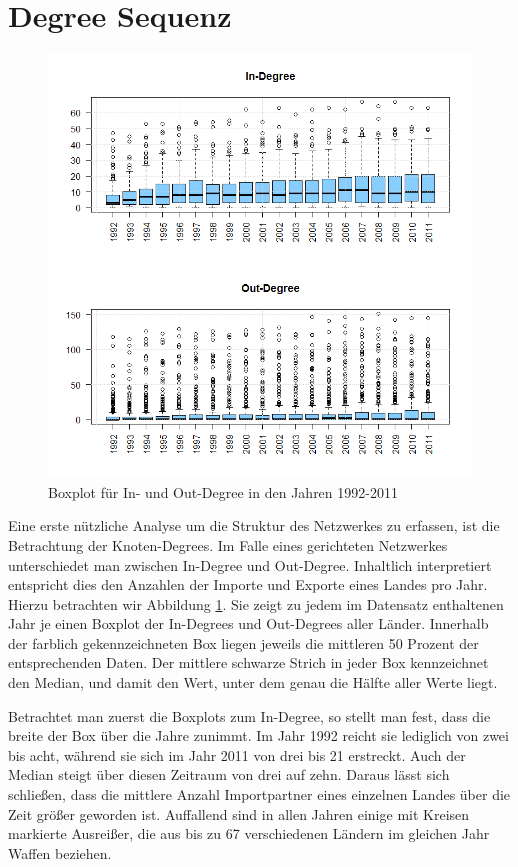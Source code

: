 \documentclass[a4paper,ngerman,oneside,titlepage,bibliography=totoc,11pt]{scrreprt}
\begin{document}
\section{Degree Sequenz}

\label{sec:degree}
\begin{figure}[ht]
	\centering
		\includegraphics[width=1.00\textwidth]{Grafiken/ts_degree.png}
	\caption{Boxplot für In- und Out-Degree in den Jahren 1992-2011}
	\label{fig:ts_degree}
\end{figure}

Eine erste nützliche Analyse um die Struktur des Netzwerkes zu erfassen, ist die Betrachtung der Knoten-Degrees. Im Falle eines gerichteten Netzwerkes unterschiedet man zwischen In-Degree und Out-Degree. Inhaltlich interpretiert entspricht dies den Anzahlen der Importe und Exporte eines Landes pro Jahr. Hierzu betrachten wir Abbildung \ref{fig:ts_degree}. Sie zeigt zu jedem im Datensatz enthaltenen Jahr je einen Boxplot der In-Degrees und Out-Degrees aller Länder. Innerhalb der farblich gekennzeichneten Box liegen jeweils die mittleren 50 Prozent der entsprechenden Daten. Der mittlere schwarze Strich in jeder Box kennzeichnet den Median, und damit den Wert, unter dem genau die Hälfte aller Werte liegt.

Betrachtet man zuerst die Boxplots zum In-Degree, so stellt man fest, dass die breite der Box über die Jahre zunimmt. Im Jahr 1992 reicht sie lediglich von zwei bis acht, während sie sich im Jahr 2011 von drei bis 21 erstreckt. Auch der Median steigt über diesen Zeitraum von drei auf zehn. Daraus lässt sich schließen, dass die mittlere Anzahl Importpartner eines einzelnen Landes über die Zeit größer geworden ist. Auffallend sind in allen Jahren einige mit Kreisen markierte Ausreißer,
die aus bis zu 67 verschiedenen Ländern im gleichen Jahr Waffen beziehen.
\end{document}
